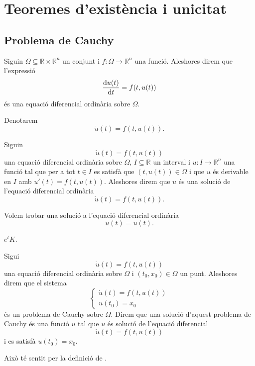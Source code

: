 \documentclass[../Apunts.tex]{subfiles}
\begin{document}
\section{Teoremes d'existència i unicitat}
	\subsection{Problema de Cauchy}
	\begin{definition}
		\label{def:equació diferencial ordinària}
		Siguin \(\Omega\subseteq\mathbb{R}\times\mathbb{R}^{n}\) un conjunt i \(f\colon\Omega\longrightarrow\mathbb{R}^{n}\) una funció. Aleshores direm que l'expressió
		\[\frac{\mathrm{d} u(t)}{\mathrm{d} t}=f(t,u(t))\]
		és una equació diferencial ordinària sobre \(\Omega\).
		
		Denotarem
		\[\dot{u}(t)=f(t,u(t)).\]
	\end{definition}
	\begin{definition}
		\label{def:solució d'una equació diferencial ordinària}
		Siguin
		\[\dot{u}(t)=f(t,u(t))\]
		una equació diferencial ordinària sobre \(\Omega\), \(I\subseteq\mathbb{R}\) un interval i \(u\colon I\longrightarrow\mathbb{R}^{n}\) una funció tal que per a tot \(t\in I\) es satisfà que \((t,u(t))\in\Omega\) i que \(u\) és derivable en \(I\) amb \(u'(t)=f(t,u(t))\). Aleshores direm que \(u\) és una solució de l'equació diferencial ordinària
		\[\dot{u}(t)=f(t,u(t)).\]
	\end{definition}
	\begin{example}	
		\label{ex:exemple d'una equació diferencial 1}
		\label{ex:exemple edos de la exponencial}
		Volem trobar una solució a l'equació diferencial ordinària
		\[\dot{u}(t)=u(t).\]
		\begin{solution}
			\(e^{t}K\).
		\end{solution}
	\end{example}
	\begin{definition}
		\label{def:problema de Cauchy}
		\label{def:solució d'un problema de Cauchy}
		Sigui
		\[\dot{u}(t)=f(t,u(t))\]
		una equació diferencial ordinària sobre \(\Omega\) i \((t_{0},x_{0})\in\Omega\) un punt. Aleshores direm que el sistema
		\[\begin{cases*}
			\displaystyle \dot{u}(t)=f(t,u(t)) \\
			\displaystyle u(t_{0})=x_{0}
		\end{cases*}\]
		és un problema de Cauchy sobre \(\Omega\). Direm que una solució d'aquest problema de Cauchy és una funció \(u\) tal que \(u\) és solució de l'equació diferencial
		\[\dot{u}(t)=f(t,u(t))\]
		i es satisfà \(u(t_{0})=x_{0}\).
		
		Això té sentit per la definició de .
	\end{definition}
\end{document}
